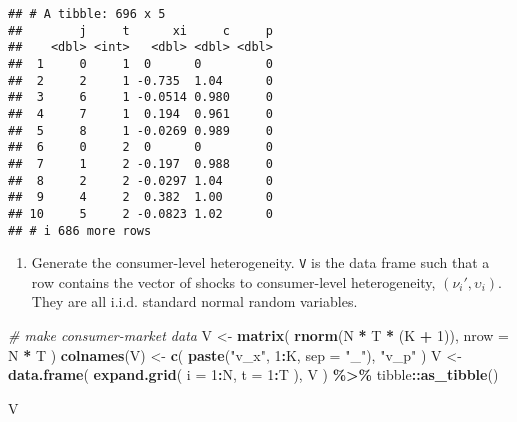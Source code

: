 \documentclass[
]{book}
\newenvironment{Shaded}{\begin{snugshade}}{\end{snugshade}}
\newcommand{\AttributeTok}[1]{\textcolor[rgb]{0.13,0.29,0.53}{#1}}
\newcommand{\CommentTok}[1]{\textcolor[rgb]{0.56,0.35,0.01}{\textit{#1}}}
\newcommand{\DecValTok}[1]{\textcolor[rgb]{0.00,0.00,0.81}{#1}}
\newcommand{\FunctionTok}[1]{\textcolor[rgb]{0.13,0.29,0.53}{\textbf{#1}}}
\newcommand{\NormalTok}[1]{#1}
\newcommand{\OtherTok}[1]{\textcolor[rgb]{0.56,0.35,0.01}{#1}}
\newcommand{\SpecialCharTok}[1]{\textcolor[rgb]{0.81,0.36,0.00}{\textbf{#1}}}
\newcommand{\StringTok}[1]{\textcolor[rgb]{0.31,0.60,0.02}{#1}}
\providecommand{\tightlist}{%
  \setlength{\itemsep}{0pt}\setlength{\parskip}{0pt}}
\begin{document}
\begin{verbatim}
## # A tibble: 696 x 5
##        j     t      xi     c     p
##    <dbl> <int>   <dbl> <dbl> <dbl>
##  1     0     1  0      0         0
##  2     2     1 -0.735  1.04      0
##  3     6     1 -0.0514 0.980     0
##  4     7     1  0.194  0.961     0
##  5     8     1 -0.0269 0.989     0
##  6     0     2  0      0         0
##  7     1     2 -0.197  0.988     0
##  8     2     2 -0.0297 1.04      0
##  9     4     2  0.382  1.00      0
## 10     5     2 -0.0823 1.02      0
## # i 686 more rows
\end{verbatim}

\begin{enumerate}
\def\labelenumi{\arabic{enumi}.}
\setcounter{enumi}{3}
\tightlist
\item
  Generate the consumer-level heterogeneity. \texttt{V} is the data frame such that a row contains the vector of shocks to consumer-level heterogeneity, \((\nu_{i}', \upsilon_i)\). They are all i.i.d. standard normal random variables.
\end{enumerate}

\begin{Shaded}
\begin{Highlighting}[]
\CommentTok{\# make consumer{-}market data}
\NormalTok{V }\OtherTok{\textless{}{-}} 
  \FunctionTok{matrix}\NormalTok{(}
    \FunctionTok{rnorm}\NormalTok{(N }\SpecialCharTok{*}\NormalTok{ T }\SpecialCharTok{*}\NormalTok{ (K }\SpecialCharTok{+} \DecValTok{1}\NormalTok{)), }
    \AttributeTok{nrow =}\NormalTok{ N }\SpecialCharTok{*}\NormalTok{ T}
\NormalTok{    ) }
\FunctionTok{colnames}\NormalTok{(V) }\OtherTok{\textless{}{-}} 
  \FunctionTok{c}\NormalTok{(}
    \FunctionTok{paste}\NormalTok{(}\StringTok{"v\_x"}\NormalTok{, }\DecValTok{1}\SpecialCharTok{:}\NormalTok{K, }\AttributeTok{sep =} \StringTok{"\_"}\NormalTok{), }
    \StringTok{"v\_p"}
\NormalTok{    )}
\NormalTok{V }\OtherTok{\textless{}{-}} 
  \FunctionTok{data.frame}\NormalTok{(}
  \FunctionTok{expand.grid}\NormalTok{(}
    \AttributeTok{i =} \DecValTok{1}\SpecialCharTok{:}\NormalTok{N, }
    \AttributeTok{t =} \DecValTok{1}\SpecialCharTok{:}\NormalTok{T}
\NormalTok{    ),}
\NormalTok{  V}
\NormalTok{  ) }\SpecialCharTok{\%\textgreater{}\%}
\NormalTok{  tibble}\SpecialCharTok{::}\FunctionTok{as\_tibble}\NormalTok{()}
\end{Highlighting}
\end{Shaded}

\begin{Shaded}
\begin{Highlighting}[]
\NormalTok{V}
\end{Highlighting}
\end{Shaded}
\end{document}
